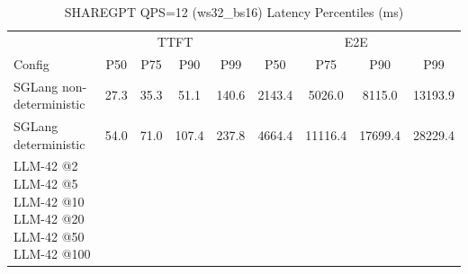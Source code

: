 \begin{table}[htbp]
\centering
\caption{SHAREGPT QPS=12 (ws32_bs16) Latency Percentiles (ms)}
\label{tab:sharegpt_qps12_ws32_bs16}
\begin{tabular}{l|cccc|cccc}
\toprule
& \multicolumn{4}{c|}{TTFT} & \multicolumn{4}{c}{E2E} \\
Config & P50 & P75 & P90 & P99 & P50 & P75 & P90 & P99 \\
\midrule
SGLang non-deterministic & 27.3 & 35.3 & 51.1 & 140.6 & 2143.4 & 5026.0 & 8115.0 & 13193.9 \\
SGLang deterministic & 54.0 & 71.0 & 107.4 & 237.8 & 4664.4 & 11116.4 & 17699.4 & 28229.4 \\
LLM-42 @2%
LLM-42 @5%
LLM-42 @10%
LLM-42 @20%
LLM-42 @50%
LLM-42 @100%
\bottomrule
\end{tabular}
\end{table}
